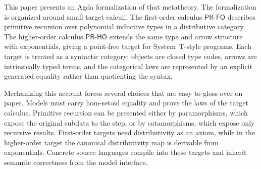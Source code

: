 \documentclass[sigplan,10pt,anonymous,review,screen]{acmart}
\newcommand{\PRFO}{\ensuremath{\mathsf{PR\mbox{-}FO}}}
\newcommand{\PRHO}{\ensuremath{\mathsf{PR\mbox{-}HO}}}
\begin{document}
This paper presents an Agda formalization of that metatheory.  The
formalization is organized around small target calculi.  The
first-order calculus \PRFO{} describes
primitive recursion over polynomial inductive types in a distributive
category.  The higher-order calculus \PRHO{} extends the same type and
arrow structure with exponentials, giving a point-free target for
System~T-style programs.  Each target is treated as a syntactic category:
objects are closed type codes, arrows are intrinsically typed terms, and
the categorical laws are represented by an explicit generated equality
rather than quotienting the syntax.

Mechanizing this account forces several choices that are easy to gloss
over on paper.  Models must carry hom-setoid equality and prove the laws
of the target calculus.  Primitive recursion can be presented either by
paramorphisms, which expose the original subdata to the step, or by
catamorphisms, which expose only recursive results.  First-order targets need
distributivity as an axiom, while in the higher-order target the
canonical distributivity map is derivable from exponentials.  Concrete
source languages compile into these targets and inherit semantic
correctness from the model interface.
\end{document}
